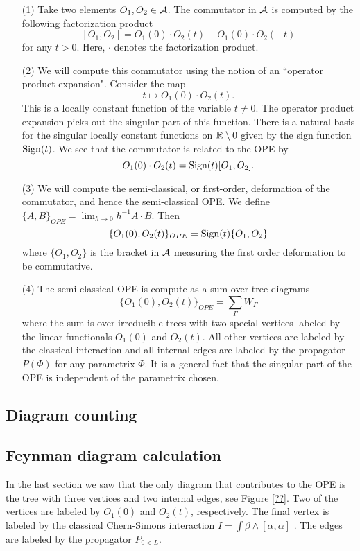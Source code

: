 \documentclass[11pt]{amsart}
\numberwithin{equation}{section}
\begin{document}
\begin{itemize}
\item[(1)] 
Take two elements $O_1, O_2 \in \mathcal A$.
The commutator in $\mathcal A$ is computed by the following factorization product
\[
[O_1, O_2] = O_1(0) \cdot O_2(t) - O_1(0) \cdot O_2(-t) 
\]
for any $t > 0$.
Here, $\cdot$ denotes the factorization product. 

\item[(2)] We will compute this commutator using the notion of an ``operator product expansion".
Consider the map
\[
t \mapsto O_1(0) \cdot O_2(t) .
\]
This is a locally constant function of the variable $t \ne 0$.
The operator product expansion picks out the singular part of this function.
There is a natural basis for the singular locally constant functions on $\mathbb R \setminus 0$ given by the sign function ${\rm Sign}(t)$. 
We see that the commutator is related to the OPE by
\[
O_1(0) \cdot O_2(t) = {\rm Sign}(t) [O_1, O_2] .
\] 

\item[(3)] We will compute the semi-classical, or first-order, deformation of the commutator, and hence the semi-classical OPE. 
We define $\{A,B\}_{OPE} = \lim_{\hbar \to 0} \hbar^{-1} A \cdot B$. 
Then
\[
\{O_1(0), O_2(t)\}_{OPE} = {\rm Sign}(t) \{O_1, O_2\} 
\]
where $\{O_1,O_2\}$ is the bracket in $\mathcal A$ measuring the first order deformation to be commutative. 

\item[(4)] 
The semi-classical OPE is compute as a sum over tree diagrams
\[
\{O_1(0), O_2(t)\}_{OPE} = \sum_{\Gamma} W_\Gamma
\]
where the sum is over irreducible trees with two special vertices labeled by the linear functionals $O_1(0)$ and $O_2(t)$. 
All other vertices are labeled by the classical interaction and all internal edges are labeled by the propagator $P(\Phi)$ for any parametrix $\Phi$. 
It is a general fact that the singular part of the OPE is independent of the parametrix chosen. 
\end{itemize}

\subsection{Diagram counting}

\subsection{Feynman diagram calculation}

In the last section we saw that the only diagram that contributes to the OPE is the tree with three vertices and two internal edges, see Figure \ref{??}. 
Two of the vertices are labeled by $O_1(0)$ and $O_2(t)$, respectively. 
The final vertex is labeled by the classical Chern-Simons interaction $I = \int \beta \wedge [\alpha, \alpha]$ .
The edges are labeled by the propagator $P_{0 < L}$.
\end{document}
